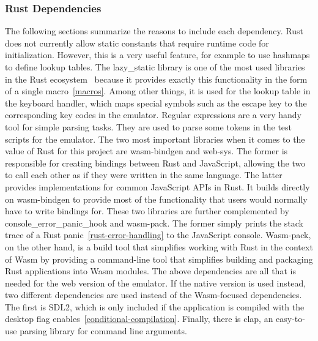 \subsubsection{Rust Dependencies} \label{rust-deps}
The following sections summarize the reasons to include each dependency.
Rust does not currently allow static constants that require runtime code for initialization. However, this is a very useful feature, for example to use hashmaps to define lookup tables.
The lazy\_static library is one of the most used libraries in the Rust ecosystem~\cite[Downloads all time]{lazystatic} because it provides exactly this functionality in the form of a single macro~\ref{macros}. Among other things, it is used for the lookup table in the keyboard handler, which maps special symbols such as the escape key to the corresponding key codes in the emulator.
Regular expressions are a very handy tool for simple parsing tasks. They are used to parse some tokens in the test scripts for the emulator.
The two most important libraries when it comes to the value of Rust for this project are wasm-bindgen and web-sys. The former is responsible for creating bindings between Rust and JavaScript, allowing the two to call each other as if they were written in the same language. The latter provides implementations for common JavaScript APIs in Rust. It builds directly on wasm-bindgen to provide most of the functionality that users would normally have to write bindings for.
These two libraries are further complemented by console\_error\_panic\_hook and wasm-pack.
The former simply prints the stack trace of a Rust panic~\ref{rust-error-handling} to the JavaScript console.
Wasm-pack, on the other hand, is a build tool that simplifies working with Rust in the context of Wasm by providing a command-line tool that simplifies building and packaging Rust applications into Wasm modules.
The above dependencies are all that is needed for the web version of the emulator. If the native version is used instead, two different dependencies are used instead of the Wasm-focused dependencies.
The first is SDL2, which is only included if the application is compiled with the desktop flag enables~\ref{conditional-compilation}.
Finally, there is clap, an easy-to-use parsing library for command line arguments.


